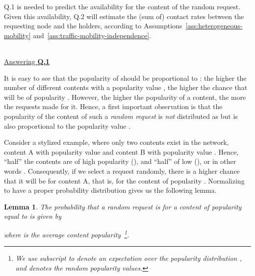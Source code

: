 \documentclass[journal]{IEEEtran}
\newtheorem{lemma}{Lemma}
\begin{document}
Q.1 is needed to predict the availability for the content of the random request. Given this availability, Q.2 will estimate the (sum of) contact rates between the requesting node and the holders, according to Assumptions~\ref{ass:heterogeneous-mobility} and~\ref{ass:traffic-mobility-independence}. 

~\\
\noindent\underline{Answering \textbf{Q.1}}

It is easy to see that the popularity of  should be proportional to : the higher the number of different contents with a popularity value , the higher the chance that  will be of popularity . However, the higher the popularity of a content, the more the requests made for it. Hence, a first important observation is that the popularity of the content of such a \textit{random request} is \textit{not} distributed as  but is also proportional to the popularity value .

Consider a stylized example, where only two contents exist in the network, content A with popularity value  and content B with popularity value . Hence, ``half'' the contents are of high popularity (), and ``half'' of low (), or in other words .  Consequently, if we select a request randomly, there is a  higher chance that it will be for content A, that is, for the content of popularity . Normalizing to have a proper probability distribution gives us the following lemma.

\begin{lemma}\label{thm:Pint-popularity}
The probability that a random request is for a content of popularity equal to  is given by

where  is the average content popularity~\footnote{We use subscript  to denote an expectation over the popularity distribution , and  denotes the random popularity values.}.
\end{lemma}
\end{document}
